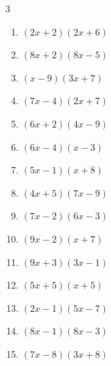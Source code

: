\begin{multicols}{3}
\begin{enumerate}
  \item $(2x+2)(2x+6)$


  \item $(8x+2)(8x-5)$


  \item $(x-9)(3x+7)$


  \item $(7x-4)(2x+7)$


  \item $(6x+2)(4x-9)$


  \item $(6x-4)(x-3)$


  \item $(5x-1)(x+8)$


  \item $(4x+5)(7x-9)$


  \item $(7x-2)(6x-3)$


  \item $(9x-2)(x+7)$


  \item $(9x+3)(3x-1)$


  \item $(5x+5)(x+5)$


  \item $(2x-1)(5x-7)$


  \item $(8x-1)(8x-3)$


\columnbreak %

  \item $(7x-8)(3x+8)$


\end{enumerate}
\end{multicols}
